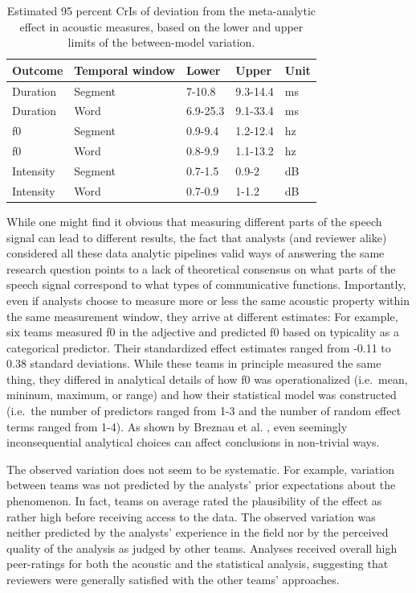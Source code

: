 \documentclass[Review,times,sageh]{sagej}
\begin{document}
\begin{table}

\caption{\label{tab:msa-sd-table}Estimated 95 percent CrIs of deviation from the meta-analytic effect in acoustic measures, based on the lower and upper limits of the between-model variation.}
\centering
\fontsize{11}{13}\selectfont
\begin{tabular}[t]{lllll}
\toprule
Outcome & Temporal window & Lower & Upper & Unit\\
\midrule
Duration & Segment & 7-10.8 & 9.3-14.4 & ms\\
Duration & Word & 6.9-25.3 & 9.1-33.4 & ms\\
f0 & Segment & 0.9-9.4 & 1.2-12.4 & hz\\
f0 & Word & 0.8-9.9 & 1.1-13.2 & hz\\
Intensity & Segment & 0.7-1.5 & 0.9-2 & dB\\
Intensity & Word & 0.7-0.9 & 1-1.2 & dB\\
\bottomrule
\end{tabular}
\end{table}

While one might find it obvious that measuring different parts of the speech signal can lead to different results, the fact that analysts (and reviewer alike) considered all these data analytic pipelines valid ways of answering the same research question points to a lack of theoretical consensus on what parts of the speech signal correspond to what types of communicative functions.
Importantly, even if analysts choose to measure more or less the same acoustic property within the same measurement window, they arrive at different estimates:
For example, six teams measured f0 in the adjective and predicted f0 based on typicality as a categorical predictor. Their standardized effect estimates ranged from -0.11 to 0.38 standard deviations.
While these teams in principle measured the same thing, they differed in analytical details of how f0 was operationalized (i.e.~mean, mininum, maximum, or range) and how their statistical model was constructed (i.e.~the number of predictors ranged from 1-3 and the number of random effect terms ranged from 1-4).
As shown by Breznau et al. \citeyearpar{breznau2021observing}, even seemingly inconsequential analytical choices can affect conclusions in non-trivial ways.

The observed variation does not seem to be systematic.
For example, variation between teams was not predicted by the analysts' prior expectations about the phenomenon.
In fact, teams on average rated the plausibility of the effect as rather high before receiving access to the data.
The observed variation was neither predicted by the analysts' experience in the field nor by the perceived quality of the analysis as judged by other teams.
Analyses received overall high peer-ratings for both the acoustic and the statistical analysis, suggesting that reviewers were generally satisfied with the other teams' approaches.
\end{document}
